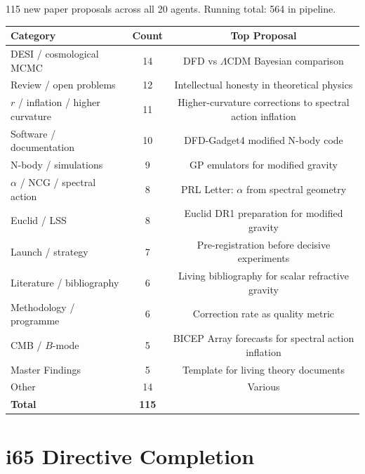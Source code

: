 \documentclass[11pt,a4paper]{article}
\begin{document}
115 new paper proposals across all 20 agents. Running total: 564 in pipeline.

\begin{center}
\begin{tabular}{lcc}
\toprule
\textbf{Category} & \textbf{Count} & \textbf{Top Proposal} \\
\midrule
DESI / cosmological MCMC & 14 & DFD vs $\Lambda$CDM Bayesian comparison \\
Review / open problems & 12 & Intellectual honesty in theoretical physics \\
$r$ / inflation / higher curvature & 11 & Higher-curvature corrections to spectral action inflation \\
Software / documentation & 10 & DFD-Gadget4 modified N-body code \\
N-body / simulations & 9 & GP emulators for modified gravity \\
$\alpha$ / NCG / spectral action & 8 & PRL Letter: $\alpha$ from spectral geometry \\
Euclid / LSS & 8 & Euclid DR1 preparation for modified gravity \\
Launch / strategy & 7 & Pre-registration before decisive experiments \\
Literature / bibliography & 6 & Living bibliography for scalar refractive gravity \\
Methodology / programme & 6 & Correction rate as quality metric \\
CMB / $B$-mode & 5 & BICEP Array forecasts for spectral action inflation \\
Master Findings & 5 & Template for living theory documents \\
Other & 14 & Various \\
\midrule
\textbf{Total} & \textbf{115} & \\
\bottomrule
\end{tabular}
\end{center}


\section{i65 Directive Completion}
\label{sec:directives-completion}
\end{document}
